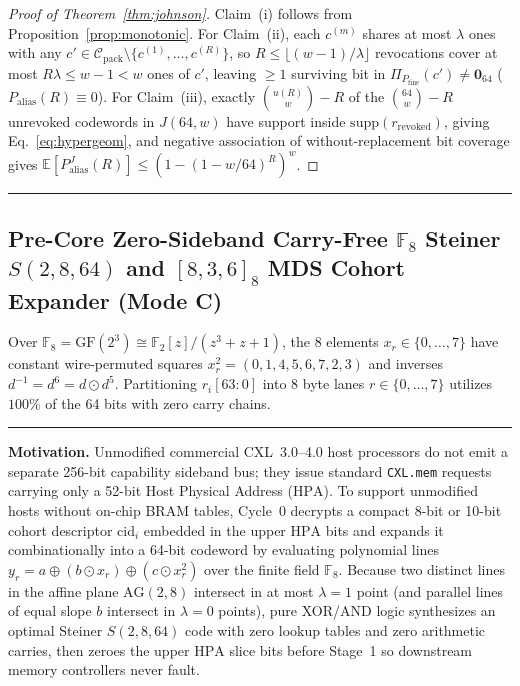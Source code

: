 \documentclass[10pt,twocolumn]{article}
\makeatletter
\newif\ifspecintwocol \specintwocolfalse
\newif\ifspecresume   \specresumefalse
\newcommand{\StartTwoCol}{%
  \if@twocolumn
    \let\spec@next\@empty
  \else
    \ifspecintwocol
      \let\spec@next\@empty
    \else
      \global\specintwocoltrue
      \def\spec@next{\begin{multicols}{2}}%
    \fi
  \fi
  \spec@next
}
\newcommand{\StopTwoCol}{%
  \if@twocolumn
    \onecolumn
    \global\specintwocolfalse
    \let\spec@next\@empty
  \else
    \ifspecintwocol
      \global\specintwocolfalse
      \def\spec@next{\end{multicols}}%
    \else
      \let\spec@next\@empty
    \fi
  \fi
  \spec@next
}
\newcommand{\BeginConnesPlate}{%
  \if@twocolumn
    \onecolumn
    \global\specresumetrue
    \let\spec@platepre\@empty
  \else
    \ifspecintwocol
      \global\specresumetrue
      \let\spec@platepre\StopTwoCol
    \else
      \global\specresumefalse
      \let\spec@platepre\@empty
    \fi
  \fi
  \spec@platepre
  \par\vspace{4pt}\noindent\textcolor{black!25}{\rule{\textwidth}{0.4pt}}\par\vspace{3pt}%
}
\newcommand{\EndConnesPlate}{%
  \par\vspace{3pt}\noindent\textcolor{black!25}{\rule{\textwidth}{0.4pt}}\par\vspace{4pt}%
  \ifspecresume
    \global\specresumefalse
    \let\spec@platepost\StartTwoCol
  \else
    \let\spec@platepost\@empty
  \fi
  \spec@platepost
}
\theoremstyle{spectralthm}
\makeatother
\begin{document}
\begin{proof}[Proof of Theorem~\ref{thm:johnson}]
Claim~(i) follows from Proposition~\ref{prop:monotonic}. For Claim~(ii), each $c^{(m)}$ shares at most $\lambda$ ones with any $c' \in \mathcal{C}_{\mathrm{pack}} \setminus \{c^{(1)},\ldots,c^{(R)}\}$, so $R \le \lfloor (w-1)/\lambda \rfloor$ revocations cover at most $R\lambda \le w - 1 < w$ ones of $c'$, leaving $\ge 1$ surviving bit in $\Pi_{P_{\mathrm{fine}}}(c') \neq \mathbf{0}_{64}$ ($P_{\mathrm{alias}}(R) \equiv 0$). For Claim~(iii), exactly $\binom{u(R)}{w} - R$ of the $\binom{64}{w} - R$ unrevoked codewords in $J(64,w)$ have support inside $\mathrm{supp}(r_{\mathrm{revoked}})$, giving Eq.~\eqref{eq:hypergeom}, and negative association of without-replacement bit coverage gives $\mathbb{E}[P_{\mathrm{alias}}^J(R)] \le (1 - (1 - w/64)^R)^w$.
\end{proof}
\EndConnesPlate

\subsection{Pre-Core Zero-Sideband Carry-Free \texorpdfstring{$\mathbb{F}_8$}{F8} Steiner \texorpdfstring{$S(2,8,64)$}{S(2,8,64)} and \texorpdfstring{$[8,3,6]_8$}{[8,3,6]8} MDS Cohort Expander (Mode C)}
\label{sec:modec}
Over $\mathbb{F}_8 = \mathrm{GF}(2^3) \cong \mathbb{F}_2[z]/(z^3 + z + 1)$, the 8 elements $x_r \in \{0,\ldots,7\}$ have constant wire-permuted squares $x_r^2 = (0,1,4,5,6,7,2,3)$ and inverses $d^{-1} = d^6 = d \odot d^5$. Partitioning $r_i[63:0]$ into 8 byte lanes $r \in \{0,\ldots,7\}$ utilizes $100\%$ of the 64 bits with zero carry chains.

\BeginConnesPlate
\noindent\textbf{Motivation.}\; Unmodified commercial CXL~3.0--4.0 host processors do not emit a separate 256-bit capability sideband bus; they issue standard \texttt{CXL.mem} requests carrying only a 52-bit Host Physical Address ($\mathrm{HPA}$). To support unmodified hosts without on-chip BRAM tables, Cycle~0 decrypts a compact 8-bit or 10-bit cohort descriptor $\mathrm{cid}_i$ embedded in the upper $\mathrm{HPA}$ bits and expands it combinationally into a 64-bit codeword by evaluating polynomial lines $y_r = a \oplus (b \odot x_r) \oplus (c \odot x_r^2)$ over the finite field $\mathbb{F}_8$. Because two distinct lines in the affine plane $\mathrm{AG}(2,8)$ intersect in at most $\lambda = 1$ point (and parallel lines of equal slope $b$ intersect in $\lambda = 0$ points), pure XOR/AND logic synthesizes an optimal Steiner $S(2,8,64)$ code with zero lookup tables and zero arithmetic carries, then zeroes the upper $\mathrm{HPA}$ slice bits before Stage~1 so downstream memory controllers never fault.
\end{document}
